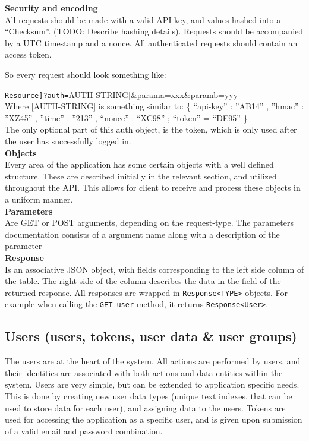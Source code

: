 \documentclass[11pt]{article}
\begin{document}
\textbf{Security and encoding} \\
All requests should be made with a valid API-key, and values hashed into a “Checksum”. (TODO: Describe hashing details). Requests should be accompanied by a UTC timestamp and a nonce. All authenticated requests should contain an access token.

So every request should look something like: 

\verb[Resource]?auth=[AUTH-STRING]\&parama=xxx\&paramb=yyy \\

Where [AUTH-STRING] is something similar to:
\{ “api-key” : ”AB14” , ”hmac” : ”XZ45” , ”time” : ”213” , “nonce” : “XC98” ; “token” = “DE95” \} \\

The only optional part of this auth object, is the token, which is only used after the user has successfully logged in. \\

\textbf{Objects} \\
Every area of the application has some certain objects with a well defined structure. These are described initially in the relevant section, and utilized throughout the API. This allows for client to receive and process these objects in a uniform manner.\\

\textbf{Parameters} \\
Are GET or POST arguments, depending on the request-type. The parameters documentation consists of a argument name along with a description of the parameter \\

\textbf{Response} \\
Is an associative JSON object, with fields corresponding to the left side column of the table. The right side of the column describes the data in the field of the returned response.
All responses are wrapped in \texttt{Response<TYPE>} objects. For example when calling the \texttt{GET user} method, it returns \texttt{Response<User>}.

\newpage

\subsection{Users (users, tokens, user data \& user groups)}

The users are at the heart of the system. All actions are performed by users, and their identities are associated with both actions and data entities within the system. Users are very simple, but can be extended to application specific needs. This is done by creating new user data types (unique text indexes, that can be used to store data for each user), and assigning data to the users. Tokens are used for accessing the application as a specific user, and is given upon submission of a valid email and password combination.
\end{document}
